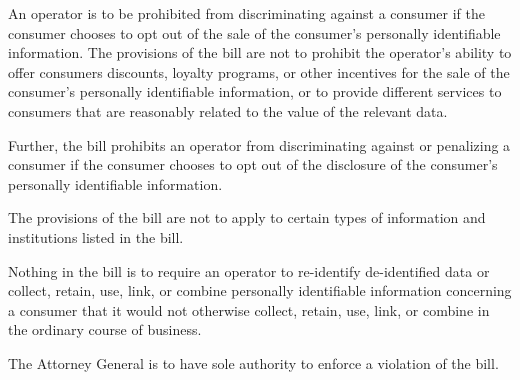      An operator is to be prohibited from discriminating against a consumer if the consumer chooses to opt out of the sale of the consumer's personally identifiable information. The provisions of the bill are not to prohibit the operator's ability to offer consumers discounts, loyalty programs, or other incentives for the sale of the consumer's personally identifiable information, or to provide different services to consumers that are reasonably related to the value of the relevant data.

     Further, the bill prohibits an operator from discriminating against or penalizing a consumer if the consumer chooses to opt out of the disclosure of the consumer's personally identifiable information.

     The provisions of the bill are not to apply to certain types of information and institutions listed in the bill.

     Nothing in the bill is to require an operator to re-identify de-identified data or collect, retain, use, link, or combine personally identifiable information concerning a consumer that it would not otherwise collect, retain, use, link, or combine in the ordinary course of business.

     The Attorney General is to have sole authority to enforce a violation of the bill.